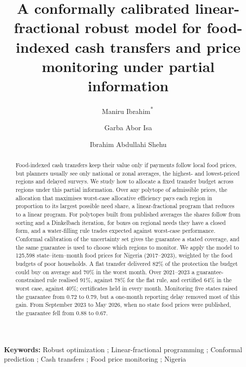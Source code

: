 \documentclass[preprint,12pt,number]{elsarticle}%
\makeatletter
\def\ELSAVAILABLE{1}%
\newenvironment{frontmatter}{}{}
\newenvironment{keyword}{\par\noindent\textbf{Keywords:} }{\par}
\newcommand{\sep}{; }
\gdef\els@auth{}\gdef\els@addr{}\gdef\elsauthsep{}
\newcommand{\corref}[1]{\textsuperscript{*}}
\newcommand{\cortext}[2][]{\g@addto@macro\els@addr{\par\textsuperscript{*}#2}}
\newcommand{\ead}[1]{\g@addto@macro\els@addr{\par Email: \texttt{#1}}}
\newcommand{\elsmaketitle}{\begin{center}{\LARGE\@title\par}\vspace{1em}{\large\els@auth\par}\vspace{0.5em}{\small\els@addr\par}\end{center}}
\theoremstyle{definition}
\theoremstyle{remark}
\makeatother
\begin{document}
\begin{frontmatter}

\title{A conformally calibrated linear-fractional robust model for food-indexed cash transfers and price monitoring under partial information}

\author[1]{Maniru Ibrahim\corref{cor1}\,}
\ead{Maniru.Ibrahim@ul.ie}
\author[2]{Garba Abor Isa}
\author[3]{Ibrahim Abdullahi Shehu}
\cortext[cor1]{Corresponding author}
\address[1]{Mathematics Applications Consortium for Science and Industry (MACSI), Department of Mathematics and Statistics, University of Limerick, Limerick, Ireland}
\address[2]{Department of Mathematics, Usmanu Danfodiyo University, Sokoto, Nigeria}
\address[3]{Department of Social Development, Umaru Ali Shinkafi Polytechnic, Sokoto, Nigeria}
\ifdefined\ELSAVAILABLE\else\elsmaketitle\fi

\begin{abstract}
Food-indexed cash transfers keep their value only if payments follow local food prices, but planners usually see only national or zonal averages, the highest- and lowest-priced regions and delayed surveys. We study how to allocate a fixed transfer budget across regions under this partial information. Over any polytope of admissible prices, the allocation that maximises worst-case allocative efficiency pays each region in proportion to its largest possible need share, a linear-fractional program that reduces to a linear program. For polytopes built from published averages the shares follow from sorting and a Dinkelbach iteration, for boxes on regional needs they have a closed form, and a water-filling rule trades expected against worst-case performance. Conformal calibration of the uncertainty set gives the guarantee a stated coverage, and the same guarantee is used to choose which regions to monitor. We apply the model to 125,598 state--item--month food prices for Nigeria (2017--2023), weighted by the food budgets of poor households. A flat transfer delivered 82\% of the protection the budget could buy on average and 70\% in the worst month. Over 2021--2023 a guarantee-constrained rule realised 91\%, against 78\% for the flat rule, and certified 64\% in the worst case, against 40\%; certificates held in every month. Monitoring five states raised the guarantee from 0.72 to 0.79, but a one-month reporting delay removed most of this gain. From September 2023 to May 2026, when no state food prices were published, the guarantee fell from 0.88 to 0.67.
\end{abstract}

\begin{keyword}
Robust optimization \sep Linear-fractional programming \sep Conformal prediction \sep Cash transfers \sep Food price monitoring \sep Nigeria
\end{keyword}

\end{frontmatter}
\end{document}
